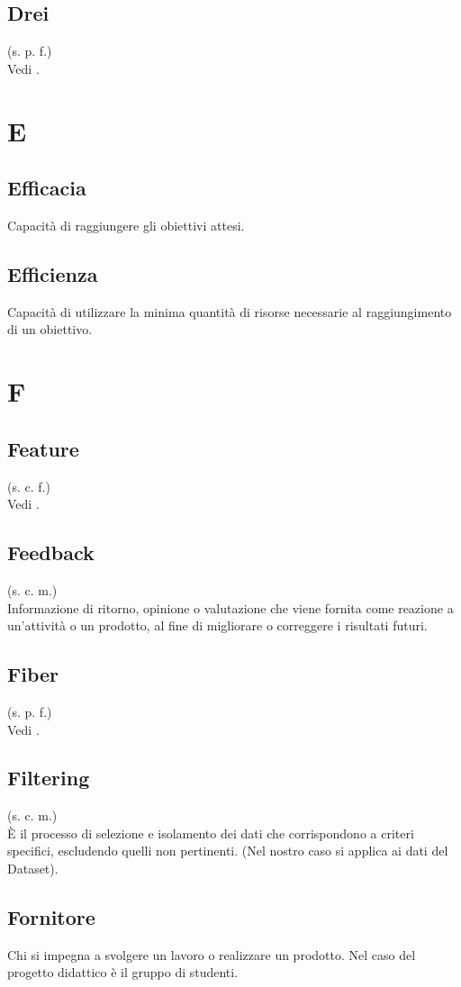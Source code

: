     \subsection{Drei}
    (s. p. f.)\\
    Vedi .
\pagebreak
\section{E}
    \subsection{Efficacia}
    Capacità di raggiungere gli obiettivi attesi.
    \subsection{Efficienza}
    Capacità di utilizzare la minima quantità di risorse necessarie al raggiungimento
    di un obiettivo.
\pagebreak
\section{F}
    \subsection{Feature}
    (s. c. f.)\\
    Vedi .
    \subsection{Feedback}
    (s. c. m.)\\
    Informazione di ritorno, opinione o valutazione che viene fornita come reazione a 
    un'attività o un prodotto, al fine di migliorare o correggere i risultati futuri.
    \subsection{Fiber}
    (s. p. f.)\\
    Vedi .
    \subsection{Filtering}
    (s. c. m.)\\
    È il processo di selezione e isolamento dei dati che corrispondono a criteri specifici, escludendo quelli non pertinenti. (Nel nostro caso si applica ai dati del Dataset).
    \subsection{Fornitore}
    Chi si impegna a svolgere un lavoro o realizzare un prodotto. Nel caso del progetto didattico
    è il gruppo di studenti.
